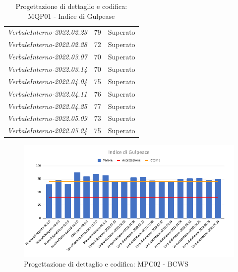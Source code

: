 \begin{table}[H]
\begin{tabular}{m{}<{\centering}  m{}<{\centering}  m{}<{\centering} }
            \textit{VerbaleInterno-2022.02.23} &
            79&
            Superato \\
            \textit{VerbaleInterno-2022.02.28} &
            72&
            Superato \\
            \textit{VerbaleInterno-2022.03.07} &
            70&
            Superato \\
            \textit{VerbaleInterno-2022.03.14} &
            70&
            Superato \\
            \textit{VerbaleInterno-2022.04.04} &
            75&
            Superato \\
            \textit{VerbaleInterno-2022.04.11} &
            76&
            Superato \\
            \textit{VerbaleInterno-2022.04.25} &
            77&
            Superato \\
            \textit{VerbaleInterno-2022.05.09} &
            73&
            Superato \\
            \textit{VerbaleInterno-2022.05.24} &
            75&
            Superato \\
    \end{tabular}
    \caption{Progettazione di dettaglio e codifica: MQP01 - Indice di Gulpease}
\end{table}
\begin{figure}[H]
    \centering
    \includegraphics[scale=0.50]{Sezioni/images/pb_prodotto/Indice_di_Gulpeace.png}
    \caption{Progettazione di dettaglio e codifica: MPC02 - BCWS}
\end{figure}
